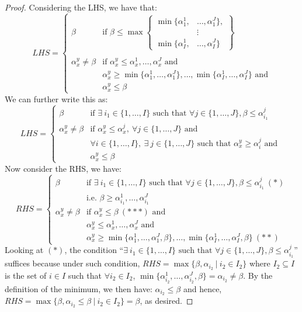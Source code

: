 \documentclass{article} %
\theoremstyle{style1}
\theoremstyle{style1}
\theoremstyle{example}
\begin{document}
\begin{proof}
Considering the LHS, we have that:
\[
LHS=
\begin{cases}
\beta & \textrm{if } \beta\leq
\max\left\{
      \begin{aligned}
        \min\{\alpha_1^1,&\ldots,\alpha_1^J\}, \\
        &\vdots \\
        \min\{\alpha_I^1,&\ldots,\alpha_I^J\}
      \end{aligned}
    \right\} \\
    \\
\alpha_x^y\not=\beta &\textrm {if } \alpha_x^y\leq\alpha_x^1,\ldots,\alpha_x^J \textrm{ and} \\
& \alpha_x^y\geq \min\{\alpha_1^1,\ldots,\alpha_1^J\},\ldots,\min\{\alpha_I^1,\ldots,\alpha_I^J\} \textrm { and}\\
& \alpha_x^y\leq \beta
\end{cases}
\]
We can further write this as:
\[
LHS=
\begin{cases}
\beta & \textrm{if }\exists\ i_1\in\{1,\ldots,I\} \textrm{ such that }\forall j\in\{1,\ldots,J\}, \beta\leq\alpha_{i_1}^j \\
\alpha_x^y\not=\beta & \textrm{if } \alpha_x^y\leq\alpha_x^j,\ \forall j\in\{1,\ldots,J\} \textrm{ and} \\
& \forall i\in\{1,\ldots,I\},\ \exists\ j\in\{1,\ldots,J\} \textrm{ such that } \alpha_x^y\geq\alpha_i^j \textrm{ and } \\
& \alpha_x^y\leq \beta
\end{cases}
\]
Now consider the RHS, we have:
\[
RHS = 
\begin{cases}
\beta & \textrm{if }\exists\ i_1\in\{1,\ldots,I\} \textrm{ such that }\forall j\in\{1,\ldots,J\}, \beta\leq\alpha_{i_1}^j\ (*) \\
& \textrm{i.e. } \beta\geq\alpha_{i_1}^1,\ldots,\alpha_{i_1}^J\\
\alpha_x^y\not=\beta &\textrm{if }\alpha_x^y\leq\beta\ (***) \textrm{ and}\\
& \alpha_x^y\leq\alpha_x^1,\ldots,\alpha_x^J \textrm{ and}\\
& \alpha_x^y\geq \min\{\alpha_1^1,\ldots,\alpha_1^J,\beta\},\ldots,\min\{\alpha_I^1,\ldots,\alpha_I^J,\beta\}\ (**)
\end{cases}
\]
Looking at $(*)$, the condition ``$\exists\ i_1\in\{1,\ldots,I\} \textrm{ such that }\forall j\in\{1,\ldots,J\}, \beta\leq\alpha_{i_1}^j$'' suffices because under such condition, $RHS=\max\{\beta, \alpha_{i_2}\ |\ i_2\in I_2\}$ where $I_2\subseteq I$ is the set of $i\in I$ such that $\forall i_2\in I_2$, $\min\{\alpha_{i_2}^1,\ldots,\alpha_{i_2}^J,\beta\}=\alpha_{i_2}\not=\beta$. By the definition of the minimum, we then have: $\alpha_{i_2}\leq\beta$ and hence, $RHS=\max\{\beta, \alpha_{i_2}\leq\beta\ |\ i_2\in I_2\}=\beta$, as desired.


\end{proof}
\end{document}
